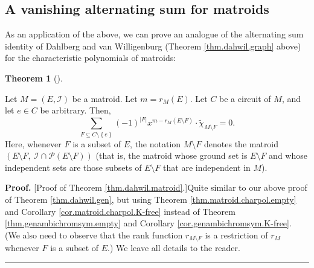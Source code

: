\documentclass[numbers=enddot,12pt,final,onecolumn,notitlepage]{scrartcl}%
\theoremstyle{definition}
\newtheorem{theo}{Theorem}[section]
\newenvironment{theorem}[1][]
{\begin{theo}[#1]\begin{leftbar}}
{\end{leftbar}\end{theo}}
\newenvironment{proof}[1][Proof]{\noindent\textbf{#1.} }{\ \rule{0.5em}{0.5em}}
\newenvironment{vershort}{}{}
\let\sumnonlimits\sum
\renewcommand{\sum}{\sumnonlimits\limits}
\begin{document}
\subsection{\label{subsec.matroid.alt-sum}A vanishing alternating sum for
matroids}

As an application of the above, we can prove an analogue of the alternating
sum identity of Dahlberg and van Willigenburg (Theorem \ref{thm.dahwil.graph}
above) for the characteristic polynomials of matroids:


\begin{theorem}
\label{thm.dahwil.matroid}Let $M=\left(  E,\mathcal{I}\right)  $ be a matroid.
Let $m=r_{M}\left(  E\right)  $. Let $C$ be a circuit of $M$, and let $e\in C$
be arbitrary. Then,%
\[
\sum_{F\subseteq C\setminus\left\{  e\right\}  }\left(  -1\right)
^{\left\vert F\right\vert }x^{m-r_{M}\left(  E\setminus F\right)  }%
\cdot\widetilde{\chi}_{M\setminus F}=0.
\]
Here, whenever $F$ is a subset of $E$, the notation $M\setminus F$ denotes the
matroid $\left(  E\setminus F,\ \mathcal{I}\cap\mathcal{P}\left(  E\setminus
F\right)  \right)  $ (that is, the matroid whose ground set is $E\setminus F$
and whose independent sets are those subsets of $E\setminus F$ that are
independent in $M$).
\end{theorem}

\begin{vershort}
\begin{proof}
[Proof of Theorem \ref{thm.dahwil.matroid}.]Quite similar to our above proof
of Theorem \ref{thm.dahwil.gen}, but using Theorem
\ref{thm.matroid.charpol.empty} and Corollary \ref{cor.matroid.charpol.K-free}
instead of Theorem \ref{thm.genambichromsym.empty} and Corollary
\ref{cor.genambichromsym.K-free}. (We also need to observe that the rank
function $r_{M\setminus F}$ is a restriction of $r_{M}$ whenever $F$ is a
subset of $E$.) We leave all details to the reader.
\end{proof}
\end{vershort}
\end{document}
